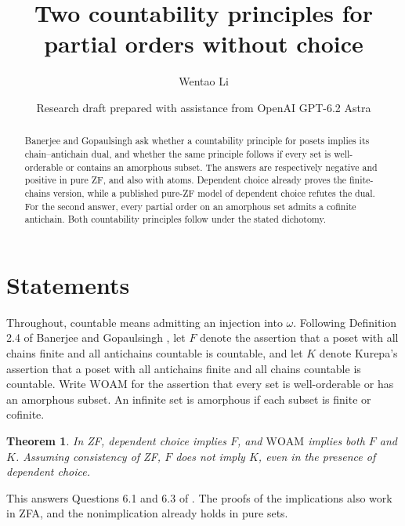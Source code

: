 \documentclass[11pt]{article}
\title{Two countability principles for partial orders without choice}
\author{Wentao Li}
\date{Research draft prepared with assistance from OpenAI GPT-6.2 Astra}
\newtheorem{theorem}{Theorem}
\begin{document}
\maketitle
\begin{abstract}
Banerjee and Gopaulsingh ask whether a countability principle for posets implies its chain--antichain dual, and whether the same principle follows if every set is well-orderable or contains an amorphous subset. The answers are respectively negative and positive in pure ZF, and also with atoms. Dependent choice already proves the finite-chains version, while a published pure-ZF model of dependent choice refutes the dual. For the second answer, every partial order on an amorphous set admits a cofinite antichain. Both countability principles follow under the stated dichotomy.
\end{abstract}

\section{Statements}
Throughout, countable means admitting an injection into $\omega$. Following Definition 2.4 of Banerjee and Gopaulsingh \cite{bg}, let $F$ denote the assertion that a poset with all chains finite and all antichains countable is countable, and let $K$ denote Kurepa's assertion that a poset with all antichains finite and all chains countable is countable. Write $\mathrm{WOAM}$ for the assertion that every set is well-orderable or has an amorphous subset. An infinite set is amorphous if each subset is finite or cofinite.
\begin{theorem}
In ZF, dependent choice implies $F$, and $\mathrm{WOAM}$ implies both $F$ and $K$. Assuming consistency of ZF, $F$ does not imply $K$, even in the presence of dependent choice.
\end{theorem}
This answers Questions 6.1 and 6.3 of \cite{bg}. The proofs of the implications also work in ZFA, and the nonimplication already holds in pure sets.
\end{document}
